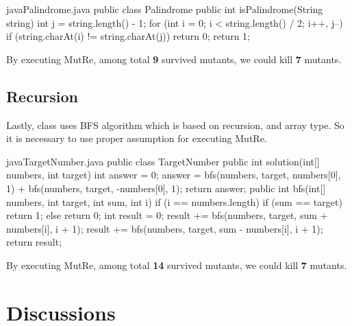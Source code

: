 \documentclass{article}
\begin{document}
\iffalse
loop는 그냥 돌리면 터진다..
사용자가 적절한 assume을 넣으면 돌아감
아래의 코드에 (assume) 넣으면 ?개의 뮤턴트 중에 !개를 죽임
\fi

\begin{listingsbox}{java}{Palindrome.java}
public class Palindrome {
    public int isPalindrome(String string) {
        int j = string.length() - 1;
        for (int i = 0; i < string.length() / 2; i++, j--) {
            if (string.charAt(i) != string.charAt(j)) {
                return 0;
            }
        }
        return 1;
    }
}
\end{listingsbox}

By executing MutRe, among total \textbf{9} survived mutants, we could kill \textbf{7} mutants.



\subsection{Recursion}
\iffalse
bfs를 사용하는 TargetNumber class는 recursion과 array type을 사용하기 때문에 적절한 assumption 없이는 path explosion이 발생한다.

- 결과: 14개의 뮤턴트 중에 7개를 죽임
\fi

Lastly,  class uses BFS algorithm which is based on recursion, and array type. So it is necessary to use proper assumption for executing MutRe.

\begin{listingsbox}{java}{TargetNumber.java}
public class TargetNumber {
    public int solution(int[] numbers, int target) {
        int answer = 0;
        answer = bfs(numbers, target, numbers[0], 1) + bfs(numbers, target, -numbers[0], 1);
        return answer;
    }
    public int bfs(int[] numbers, int target, int sum, int i) {
        if (i == numbers.length) {
            if (sum == target) {
                return 1;
            } else {
                return 0;
            }
        }
        int result = 0;
        result += bfs(numbers, target, sum + numbers[i], i + 1);
        result += bfs(numbers, target, sum - numbers[i], i + 1);
        return result;
    }
}
\end{listingsbox}

By executing MutRe, among total \textbf{14} survived mutants, we could kill \textbf{7} mutants.




\section{Discussions}
\end{document}
